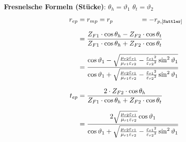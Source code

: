 \textbf{Fresnelsche Formeln (Stücke)}: \qquad $ \theta_h = \vartheta_{1} $ \quad $ \theta_t = \vartheta_{2} $
\begin{equation*}
	\setlength{\jot}{10pt}
	\begin{aligned}
		r_{ep}    & =  r_{mp} = r_{p}  \qquad \qquad =-r_{p,[\texttt{Sattler}]}
		\\
		& = \frac{Z_{F1} \cdot \cos \theta_h-Z_{F2} \cdot \cos \theta_t}{Z_{F1} \cdot \cos \theta_h+Z_{F2} \cdot \cos \theta_t}
		\\
		& =\frac{\cos \vartheta_1-\sqrt{\frac{\mu_{r 2} \varepsilon_{r 1}}{\mu_{r 1} \varepsilon_{r 2}}-\frac{\varepsilon_{r 1}{ }^2}{\varepsilon_{r 2}{ }^2} \sin ^2 \vartheta_1}}{\cos \vartheta_1+\sqrt{\frac{\mu_{r 2} \varepsilon_{r 1}}{\mu_{r 1} \varepsilon_{r 2}}-\frac{\varepsilon_{r 1}{ }^2}{\varepsilon_{r 2}{} ^2} \sin ^2 \vartheta_1}} \\
		t_{ep} & =  \frac{2 \cdot Z_{F2}   \cdot  \cos \theta_h}{Z_{F1} \cdot \cos \theta_h+Z_{F2} \cdot \cos \theta_t}\\                                                                                                                           %
				&=\frac{2 \sqrt{\frac{\mu_{r 2} \varepsilon_{r 1}}{\mu_{r 1} \varepsilon_{r 2}}} \cos \vartheta_1}{\cos \vartheta_1+\sqrt{\frac{\mu_{r 2} \varepsilon_{r 1}}{\mu_{r 1} \varepsilon_{r 2}}-\frac{\varepsilon_{r 1}{ }^2}{\varepsilon_{r 2}{ }^2} \sin ^2 \vartheta_1}} \\

\end{aligned}
\end{equation*}
